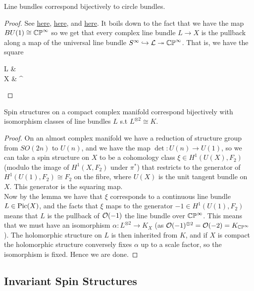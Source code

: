 \documentclass{article}
\begin{document}
\begin{lemma}
	Line bundles correspond bijectively to circle bundles.
\end{lemma}
\begin{proof}
	See \href{https://ncatlab.org/nlab/show/classifying+space}{here}, \href{https://ncatlab.org/nlab/show/circle+bundle}{here}, and \href{https://en.wikipedia.org/wiki/Complex_projective_space}{here}. It boils down to the fact that we have the map $BU(1) \cong \mathbb{CP}^\infty$ so we get that every complex line bundle $L \to X$ is the pullback along a map of the universal line bundle $S^\infty \hookrightarrow \mathcal{L} \twoheadrightarrow \mathbb{CP}^\infty$. That is, we have the square
	\begin{tkz}
		L \arrow[r] \arrow[d] &  \arrow[d] \\ X \arrow[r] & ^\infty  
	\end{tkz}
\end{proof}

\begin{prop}
	Spin structures on a compact complex manifold correspond bijectively with isomorphism classes of line bundles $L$ s.t $L^{\otimes 2}\cong K$. 
\end{prop}
\begin{proof}
	On an almost complex manifold we have a reduction of structure group from $SO(2n)$ to $U(n)$, and we have the map $\det:U(n) \to U(1)$, so we can take a spin structure on $X$ to be a cohomology class $\xi \in H^1(U(X),F_2)$ (modulo the image of $H^1(X,F_2)$ under $\pi^\ast$) that restricts to the generator of $H^1(U(1),F_2)\cong F_2$ on the fibre, where $U(X)$ is the unit tangent bundle on $X$. This generator is the squaring map. \\
	Now by the lemma we have that $\xi$ corresponds to a continuous line bundle $L \in \operatorname{Pic}(X)$, and the facts that $\xi$ maps to the generator $-1 \in H^1(U(1),F_2)$ means that $L$ is the pullback of $\mathcal{O}(-1)$ the line bundle over $\mathbb{CP}^\infty$. This means that we must have an isomorphism $\alpha:L^{\otimes 2} \to K_X$ (as $\mathcal{O}(-1)^{\otimes 2} = \mathcal{O}(-2) = K_{\mathbb{CP}^\infty}$). The holomorphic structure on $L$ is then inherited from $K$, and if $X$ is compact the holomorphic structure conversely fixes $\alpha$ up to a scale factor, so the isomorphism is fixed. Hence we are done.
\end{proof}

\subsection{Invariant Spin Structures}
\end{document}
